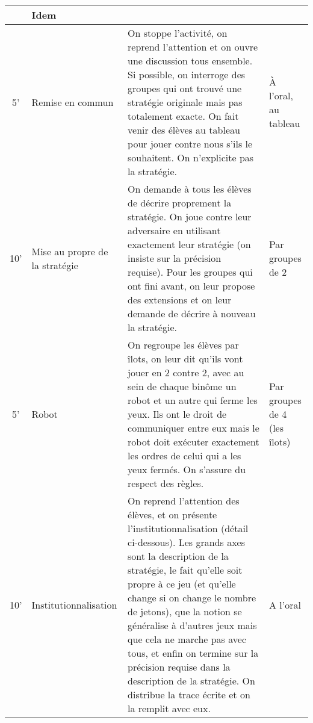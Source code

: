 \documentclass[12pt, a4paper]{article}
\begin{document}
\begin{longtable}{c|m{3.9cm}|m{8.4cm}|m{2.4cm}}
		& Idem
		
		\\ \hline
		
		5' &
		
		Remise en commun
		
		&
		
		On stoppe l'activité, on reprend l'attention et on ouvre une discussion tous ensemble. Si possible, on interroge des groupes qui ont trouvé une stratégie originale mais pas totalement exacte. On fait venir des élèves au tableau pour jouer contre nous s'ils le souhaitent. On n'explicite pas la stratégie.
		
		& 
		
		À l'oral, au tableau
		
		\\ \hline
		
		10' 
		
		&
		
		Mise au propre de la stratégie 
		
		&
		
		On demande à tous les élèves de décrire proprement la stratégie. On joue contre leur adversaire en utilisant exactement leur stratégie (on insiste sur la précision requise). Pour les groupes qui ont fini avant, on leur propose des extensions et on leur demande de décrire à nouveau la stratégie. 
		
		&
		
		Par groupes de 2
		
		\\  \hline
		
		5'
		
		&
		
		Robot
		
		&
		
		On regroupe les élèves par îlots, on leur dit qu'ils vont jouer en 2 contre 2, avec au sein de chaque binôme un robot et un autre qui ferme les yeux. Ils ont le droit de communiquer entre eux mais le robot doit exécuter exactement les ordres de celui qui a les yeux fermés. On s'assure du respect des règles.
		
		& 
		
		Par groupes de 4 (les îlots)
		
		\\ \hline
		
		10'
		
		&
		
		Institutionnalisation
		
		&
		
		On reprend l'attention des élèves, et on présente l'institutionnalisation (détail ci-dessous). Les grands axes sont la description de la stratégie, le fait qu'elle soit propre à ce jeu (et qu'elle change si on change le nombre de jetons), que la notion se généralise à d'autres jeux mais que cela ne marche pas avec tous, et enfin on termine sur la précision requise dans la description de la stratégie. On distribue la trace écrite et on la remplit avec eux.
		
		&
		
		A l'oral
		
	\end{longtable}
	
\end{document}
